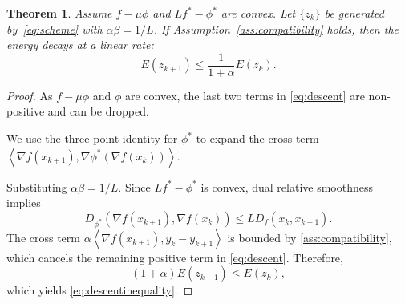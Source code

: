 \documentclass{article}
\newcommand{\dual}[1]{\left\langle {#1} \right\rangle}
\theoremstyle{plain}
\newtheorem{theorem}{Theorem}[section]
\theoremstyle{definition}
\theoremstyle{remark}
\begin{document}
\begin{theorem}%
  \label{thm:descentinequality}
  Assume $f-\mu\phi$ and $Lf^*-\phi^*$ are convex.  Let $\{z_k\}$ be generated
by~\eqref{eq:scheme} with $\alpha\beta=1/L$.  If Assumption~\ref{ass:compatibility}
holds, then the energy decays at a linear rate:
\begin{equation}\label{eq:descentinequality}
E(z_{k+1}) \le \frac{1}{1+\alpha} E(z_k).
\end{equation}
\end{theorem}
\begin{proof}
As $f-\mu\phi$ and $\phi$ are convex, the last two terms in \eqref{eq:descent} are non-positive and can be dropped.

We use the three-point identity for $\phi^*$ to expand the cross term $\dual{\nabla f(x_{k+1}),\nabla \phi^*(\nabla f(x_{k}))}$.

Substituting $\alpha\beta=1/L$. Since $Lf^*-\phi^*$ is convex, dual relative smoothness implies
\[
D_{\phi^*}(\nabla f(x_{k+1}),\nabla f(x_k))
\le LD_f(x_k,x_{k+1}).
\]
The cross term $\alpha\dual{\nabla f(x_{k+1}),y_k-y_{k+1}}$ is bounded by \eqref{ass:compatibility},
%
which cancels the remaining positive term in \eqref{eq:descent}. Therefore,
\[
(1+\alpha)E(z_{k+1}) \le E(z_k),
\]
which yields \eqref{eq:descentinequality}.
\end{proof}

\label{sec:dis_examples}
\end{document}
